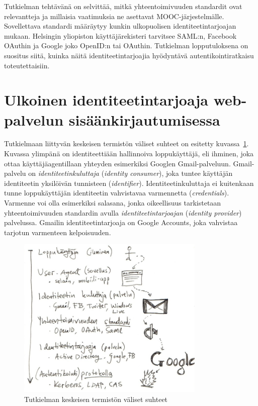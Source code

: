 \documentclass[finnish,gradu]{tktltiki}
\begin{document}
Tutkielman tehtävänä on selvittää, mitkä yhteentoimivuuden standardit ovat relevantteja ja millaisia vaatimuksia ne asettavat MOOC-järjestelmälle. Sovellettava standardi määräytyy kunkin ulkopuolisen identiteetintarjoajan mukaan. Helsingin yliopiston käyttäjärekisteri tarvitsee SAML:n, Facebook OAuthin ja Google joko OpenID:n tai OAuthin. Tutkielman lopputuloksena on suositus siitä, kuinka näitä identiteetintarjoajia hyödyntävä autentikointiratkaisu toteutettaisiin.





\section{Ulkoinen identiteetintarjoaja web-palvelun sisäänkirjautumisessa} %
\label{sec:kakkosluku}




Tutkielmaan liittyvän keskeisen termistön väliset suhteet on esitetty kuvassa~\ref{fig:yleiskuva_termien_suhteista}. Kuvassa ylimpänä on identiteettiään hallinnoiva loppukäyttäjä, eli ihminen, joka ottaa käyttäjäagentillaan yhteyden esimerkiksi Googlen Gmail-palveluun. Gmail-palvelu on \emph{identiteetinkuluttaja} (\emph{identity consumer}), joka tuntee käyttäjän identiteetin yksilöivän tunnisteen (\emph{identifier}). Identiteetinkuluttaja ei kuitenkaan tunne loppukäyttäjän identiteetin vahvistavaa varmennetta (\emph{credentials}). Varmenne voi olla esimerkiksi salasana, jonka oikeellisuus tarkistetaan yhteentoimivuuden standardin avulla \emph{identiteetintarjoajan} (\emph{identity provider}) palvelussa. Gmailin identiteetintarjoaja on Google Accounts, joka vahvistaa tarjotun varmenteen kelpoisuuden.

\begin{figure}[h!]
  \centering
  \includegraphics[width=0.8\textwidth]{images/auth_yleiskuva.jpg}
  \caption{Tutkielman keskeisen termistön väliset suhteet}
  \label{fig:yleiskuva_termien_suhteista}
\end{figure}
\end{document}
